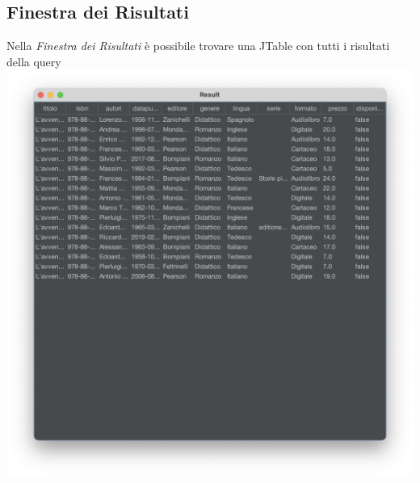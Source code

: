  \subsection{Finestra dei Risultati}
 Nella \textit{Finestra dei Risultati} è possibile trovare una JTable con tutti i risultati della query
 \\
 \includegraphics[scale=0.25, center]{Immagini/Schermate/Search/ResultPage.png}

